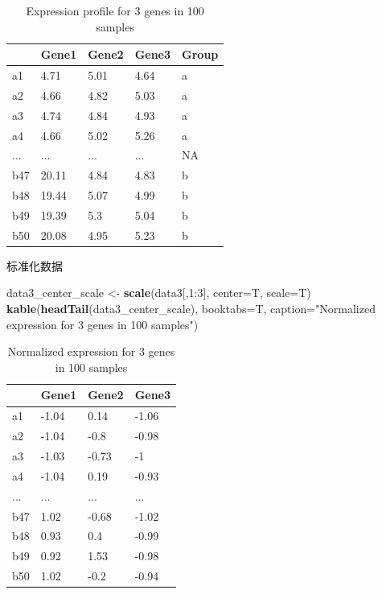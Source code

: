 \documentclass[]{article}
\newenvironment{Shaded}{\begin{snugshade}}{\end{snugshade}}
\newcommand{\KeywordTok}[1]{\textcolor[rgb]{0.13,0.29,0.53}{\textbf{{#1}}}}
\newcommand{\DataTypeTok}[1]{\textcolor[rgb]{0.13,0.29,0.53}{{#1}}}
\newcommand{\DecValTok}[1]{\textcolor[rgb]{0.00,0.00,0.81}{{#1}}}
\newcommand{\StringTok}[1]{\textcolor[rgb]{0.31,0.60,0.02}{{#1}}}
\newcommand{\NormalTok}[1]{{#1}}
\numberwithin{figure}{section}
\numberwithin{table}{section}
\theoremstyle{definition}
\theoremstyle{definition}
\theoremstyle{definition}
\theoremstyle{remark}
\begin{document}
\begin{table}

\caption{\label{tab:showdata3}Expression profile for 3 genes in 100 samples}
\centering
\begin{tabular}[t]{lllll}
\toprule
  & Gene1 & Gene2 & Gene3 & Group\\
\midrule
a1 & 4.71 & 5.01 & 4.64 & a\\
a2 & 4.66 & 4.82 & 5.03 & a\\
a3 & 4.74 & 4.84 & 4.93 & a\\
a4 & 4.66 & 5.02 & 5.26 & a\\
... & ... & ... & ... & NA\\
\addlinespace
b47 & 20.11 & 4.84 & 4.83 & b\\
b48 & 19.44 & 5.07 & 4.99 & b\\
b49 & 19.39 & 5.3 & 5.04 & b\\
b50 & 20.08 & 4.95 & 5.23 & b\\
\bottomrule
\end{tabular}
\end{table}

标准化数据

\begin{Shaded}
\begin{Highlighting}[]
\NormalTok{data3_center_scale <-}\StringTok{ }\KeywordTok{scale}\NormalTok{(data3[,}\DecValTok{1}\NormalTok{:}\DecValTok{3}\NormalTok{], }\DataTypeTok{center=}\NormalTok{T, }\DataTypeTok{scale=}\NormalTok{T)}
\KeywordTok{kable}\NormalTok{(}\KeywordTok{headTail}\NormalTok{(data3_center_scale), }\DataTypeTok{booktabs=}\NormalTok{T, }
        \DataTypeTok{caption=}\StringTok{"Normalized expression for 3 genes in 100 samples"}\NormalTok{)}
\end{Highlighting}
\end{Shaded}

\begin{table}

\caption{\label{tab:scaledata3}Normalized expression for 3 genes in 100 samples}
\centering
\begin{tabular}[t]{llll}
\toprule
  & Gene1 & Gene2 & Gene3\\
\midrule
a1 & -1.04 & 0.14 & -1.06\\
a2 & -1.04 & -0.8 & -0.98\\
a3 & -1.03 & -0.73 & -1\\
a4 & -1.04 & 0.19 & -0.93\\
... & ... & ... & ...\\
\addlinespace
b47 & 1.02 & -0.68 & -1.02\\
b48 & 0.93 & 0.4 & -0.99\\
b49 & 0.92 & 1.53 & -0.98\\
b50 & 1.02 & -0.2 & -0.94\\
\bottomrule
\end{tabular}
\end{table}
\end{document}
